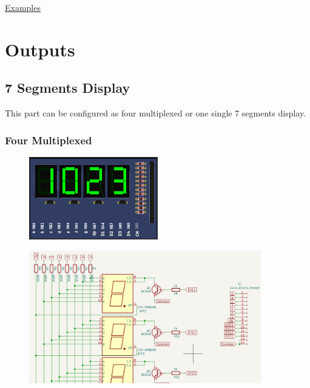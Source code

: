\href{https://lcgamboa.github.io/picsimlab_examples/parts_Ultrasonic_HC-SR04.html}{Examples}

\vspace{0.5cm}



\section{Outputs}

\subsection{7 Segments Display}

This part can be configured as four multiplexed or one single 7 segments display.

\subsubsection{Four Multiplexed}
\begin{figure}[H]
\center
\includegraphics[width=0.5\textwidth]{img/part_7seg.png} 
\end{figure} 

\begin{figure}[H]
\center
\includegraphics[width=0.9\textwidth]{img/part_7seg_.png} 
\end{figure} 


